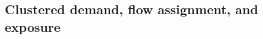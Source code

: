 \documentclass[lettersize,journal]{IEEEtran}
\begin{document}


\subsection{Clustered demand, flow assignment, and exposure}
\end{document}
